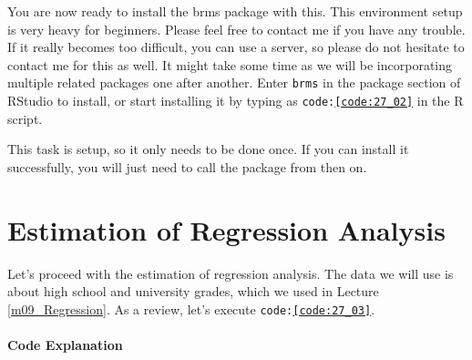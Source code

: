 \documentclass{ltjbook}
\begin{document}
You are now ready to install the brms package with this. This environment setup is very heavy for beginners. Please feel free to contact me if you have any trouble. If it really becomes too difficult, you can use a server, so please do not hesitate to contact me for this as well.
It might take some time as we will be incorporating multiple related packages one after another.
Enter \texttt{brms} in the package section of RStudio to install, or start installing it by typing as \texttt{code:\ref{code:27_02}} in the R script.




This task is setup, so it only needs to be done once. If you can install it successfully, you will just need to call the package from then on.
\section{Estimation of Regression Analysis}
Let's proceed with the estimation of regression analysis. The data we will use is about high school and university grades, which we used in Lecture \ref{m09_Regression}. As a review, let's execute \texttt{code:\ref{code:27_03}}.


\paragraph{Code Explanation}

\end{document}

